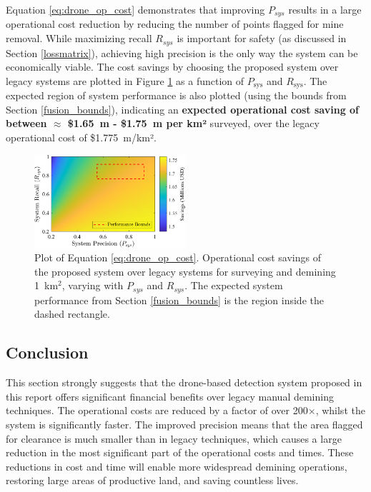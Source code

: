 Equation \ref{eq:drone_op_cost} demonstrates that improving $P_{sys}$ results in a large operational cost reduction by reducing the number of points flagged for mine removal. While maximizing recall $R_{sys}$ is important for safety (as discussed in Section \ref{lossmatrix}), achieving high precision is the only way the system can be economically viable. The cost savings by choosing the proposed system over legacy systems are plotted in Figure \ref{fig:financial_savings} as a function of $P_\text{sys}$ and $R_\text{sys}$. The expected region of system performance is also plotted (using the bounds from Section \ref{fusion_bounds}), indicating an \textbf{expected operational cost saving of between $\approx$ \$1.65~m - \$1.75~m per km²} surveyed, over the legacy operational cost of \$1.775~m/km². 


\begin{figure}[h!]
\centering
\includegraphics[width=0.5\textwidth]{figs/Rory/financial_savings.pdf} 
\caption{Plot of Equation \ref{eq:drone_op_cost}. Operational cost savings of the proposed system over legacy systems for surveying and demining 1~km$^2$, varying with $P_{sys}$ and $R_{sys}$. The expected system performance from Section \ref{fusion_bounds} is the region inside the dashed rectangle.}
\label{fig:financial_savings}
\end{figure}


\subsection{Conclusion} \label{subsec:finance_conclusion}

This section strongly suggests that the drone-based detection system proposed in this report offers significant financial benefits over legacy manual demining techniques. The operational costs are reduced by a factor of over 200$\times$, whilst the system is significantly faster. The improved precision means that the area flagged for clearance is much smaller than in legacy techniques, which causes a large reduction in the most significant part of the operational costs and times. These reductions in cost and time will enable more widespread demining operations, restoring large areas of productive land, and saving countless lives. 


